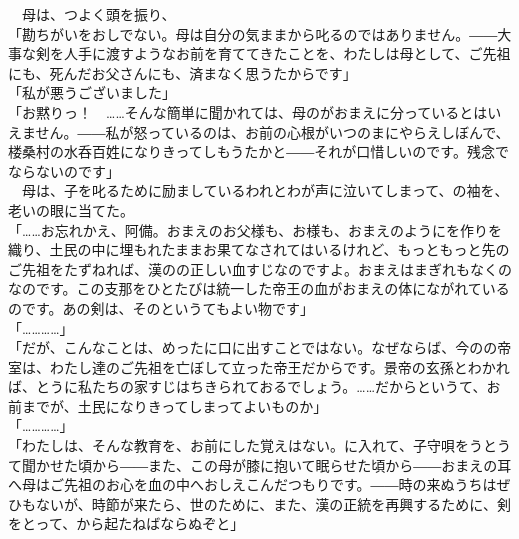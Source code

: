 \documentclass[
  paper=a5,
  fontsize=10pt,
  jafontsize=9.5pt,
  tate,                  %
  open_bracket_pos=nibu, %
]{jlreq}
\begin{document}
　母は、つよく頭を振り、\\


「勘ちがいをおしでない。母は自分の気ままから叱るのではありません。――大事な剣を人手に渡すようなお前を育ててきたことを、わたしは母として、ご先祖にも、死んだお父さんにも、済まなく思うたからです」\\


「私が悪うございました」\\


「お黙りっ！　……そんな簡単に聞かれては、母のがおまえに分っているとはいえません。――私が怒っているのは、お前の心根がいつのまにやらえしぼんで、楼桑村の水呑百姓になりきってしもうたかと――それが口惜しいのです。残念でならないのです」\\


　母は、子を叱るために励ましているわれとわが声に泣いてしまって、の袖を、老いの眼に当てた。\\


「……お忘れかえ、阿備。おまえのお父様も、お様も、おまえのようにを作りを織り、土民の中に埋もれたままお果てなされてはいるけれど、もっともっと先のご先祖をたずねれば、漢のの正しい血すじなのですよ。おまえはまぎれもなくのなのです。この支那をひとたびは統一した帝王の血がおまえの体にながれているのです。あの剣は、そのというてもよい物です」\\


「…………」\\


「だが、こんなことは、めったに口に出すことではない。なぜならば、今のの帝室は、わたし達のご先祖を亡ぼして立った帝王だからです。景帝の玄孫とわかれば、とうに私たちの家すじはちきられておるでしょう。……だからというて、お前までが、土民になりきってしまってよいものか」\\


「…………」\\


「わたしは、そんな教育を、お前にした覚えはない。に入れて、子守唄をうとうて聞かせた頃から――また、この母が膝に抱いて眠らせた頃から――おまえの耳へ母はご先祖のお心を血の中へおしえこんだつもりです。――時の来ぬうちはぜひもないが、時節が来たら、世のために、また、漢の正統を再興するために、剣をとって、から起たねばならぬぞと」\\
\end{document}
